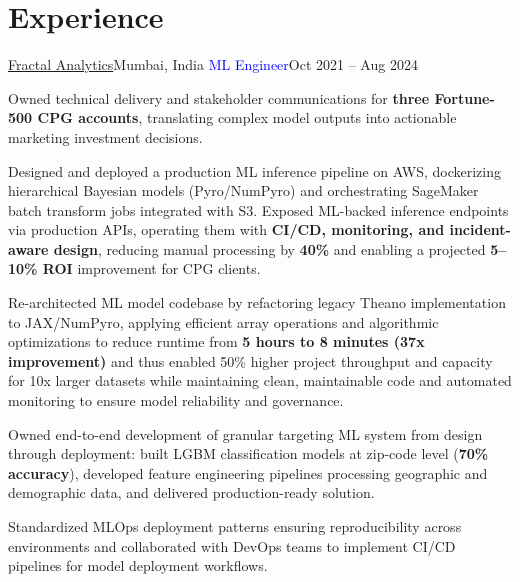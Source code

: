 \section{Experience}
 \resumeSubHeadingListStart

    \resumeSubheading
      {\href{https://drive.google.com/file/d/10sMPuoBGO8S7p0PfTe7Hr_CULP5aWhup/view}{Fractal Analytics}}{Mumbai, India}
      {\textcolor{Blue}{ML Engineer}}{Oct 2021 -- Aug 2024}
      
      \resumeItemListStart
          {Owned technical delivery and stakeholder communications for \textbf{three Fortune-500 CPG accounts}, translating complex model outputs into actionable marketing investment decisions.}

          {Designed and deployed a production ML inference pipeline on AWS, dockerizing hierarchical Bayesian models (Pyro/NumPyro) and orchestrating SageMaker batch transform jobs integrated with S3. Exposed ML-backed inference endpoints via production APIs, operating them with \textbf{CI/CD, monitoring, and incident-aware design}, reducing manual processing by \textbf{40\%} and enabling a projected \textbf{5–10\% ROI} improvement for CPG clients.}         
          
          {Re-architected ML model codebase by refactoring legacy Theano implementation to JAX/NumPyro, applying efficient array operations and algorithmic optimizations to reduce runtime from \textbf{5 hours to 8 minutes (37x improvement)} and thus enabled 50\% higher project throughput and capacity for 10x larger datasets while maintaining clean, maintainable code and automated monitoring to ensure model reliability and governance.}
          
          {Owned end-to-end development of granular targeting ML system from design through deployment: built LGBM classification models at zip-code level (\textbf{70\% accuracy}), developed feature engineering pipelines processing geographic and demographic data, and delivered production-ready solution.}
                  
          {Standardized MLOps deployment patterns ensuring reproducibility across environments and collaborated with DevOps teams to implement CI/CD pipelines for model deployment workflows.}

